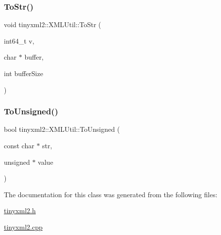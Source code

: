 \subsubsection{\texorpdfstring{To\+Str()}{ToStr()}\hspace{0.1cm}{\footnotesize\ttfamily [6/6]}}
{\footnotesize\ttfamily void tinyxml2\+::\+X\+M\+L\+Util\+::\+To\+Str (\begin{DoxyParamCaption}\item[{int64\+\_\+t}]{v,  }\item[{char $\ast$}]{buffer,  }\item[{int}]{buffer\+Size }\end{DoxyParamCaption})\hspace{0.3cm}{\ttfamily [static]}}

\mbox{\label{classtinyxml2_1_1_x_m_l_util_a210c8637d5eb4ce3d4625294af0efc2f}} 
\subsubsection{\texorpdfstring{To\+Unsigned()}{ToUnsigned()}}
{\footnotesize\ttfamily bool tinyxml2\+::\+X\+M\+L\+Util\+::\+To\+Unsigned (\begin{DoxyParamCaption}\item[{const char $\ast$}]{str,  }\item[{unsigned $\ast$}]{value }\end{DoxyParamCaption})\hspace{0.3cm}{\ttfamily [static]}}



The documentation for this class was generated from the following files\+:\begin{DoxyCompactItemize}
\item 
\mbox{\hyperlink{tinyxml2_8h}{tinyxml2.\+h}}\item 
\mbox{\hyperlink{tinyxml2_8cpp}{tinyxml2.\+cpp}}\end{DoxyCompactItemize}
